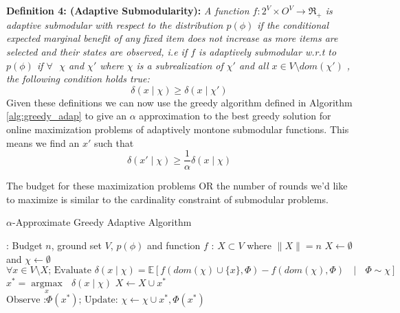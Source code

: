 {\bf Definition 4: (Adaptive Submodularity):}
{\it A function $f:2^V \times O^V \rightarrow \Re_+$ is adaptive submodular with respect to the distribution $p(\phi)$ if the conditional expected marginal benefit of any fixed item does not increase as more items are selected and their states are observed, i.e if $f$ is adaptively submodular w.r.t to $p(\phi)$ if $\forall \text{ } \chi$ and $\chi'$ where $\chi$ is a subrealization of $\chi'$ and all $x\in V \setminus dom(\chi')$ , the following condition holds true:}
\[
 \delta(x\mid\chi) \geq \delta(x\mid\chi')
\]
Given these definitions we can now use the greedy algorithm defined in Algorithm \ref{alg:greedy_adap} to give an $\alpha$ approximation to the best greedy solution for online maximization problems of adaptively montone submodular functions. This means we find an $x'$ such that
\[
 \delta(x'\mid\chi) \geq \frac{1}{\alpha}\delta(x\mid\chi)
\]

The budget for these maximization problems OR the number of rounds we'd like to maximize is similar to the cardinality constraint of submodular problems.

\begin{algorithm}[htb]
\caption{$\alpha$-Approximate Greedy Adaptive Algorithm}
\label{alg:greedy_adap}
\begin{algorithmic}[1]
\footnotesize
{}: Budget $n$, ground set $V$, $p(\phi)$ and function $f$ 
: $X \subset V$ where $\|X\| = n$
 $X \leftarrow \emptyset$ and $\chi \leftarrow \emptyset$
  \State $\forall x \in V\setminus X \text{; Evaluate } \delta(x\mid\chi) = \mathbb{E}[f(dom(\chi)\cup\{x\},\Phi) - f(dom(\chi),\Phi) \text{ } \mid \text{ } \Phi \sim \chi]$
  \State $x^* = \underset{x}{\operatorname{argmax }}\text{ } \delta(x\mid\chi)$
  \State $X \leftarrow X \cup {x^*}$
  \State $\text{Observe :} \Phi(x^*) \text{; Update: } \chi \leftarrow \chi \cup {x^*,\Phi(x^*)}$
\EndFor
\end{algorithmic}
\end{algorithm}